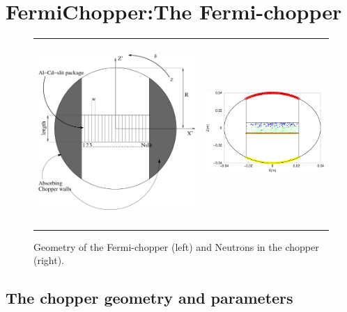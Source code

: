 \section{FermiChopper:The Fermi-chopper}


\begin{figure}
\begin{center}
\begin{tabular}{cc}
\includegraphics[height=7cm]{./figures/FCChoppergeo.eps}
&
\includegraphics[height=5cm,width=5.3cm]{./figures/FCOverview.eps}
\end{tabular}
\end{center}
\caption{Geometry of the Fermi-chopper (left) and Neutrons in the chopper (right).}
\label{fig:Overview.eps}
\end{figure}

\subsection{The chopper geometry and parameters}
\label{ssec:chopper}

